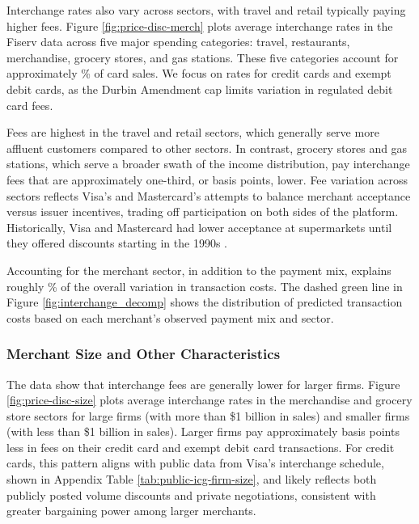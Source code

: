 \documentclass[main.tex]{subfiles}
\begin{document}
Interchange rates also vary across sectors, with travel and retail typically paying higher fees.
Figure \ref{fig:price-disc-merch} plots average interchange rates in the Fiserv data across five major spending categories: travel, restaurants, merchandise, grocery stores, and gas stations.
These five categories account for approximately \% of card sales.
We focus on rates for credit cards and exempt debit cards, as the Durbin Amendment cap limits variation in regulated debit card fees.

Fees are highest in the travel and retail sectors, which generally serve more affluent customers compared to other sectors.
In contrast, grocery stores and gas stations, which serve a broader swath of the income distribution, pay interchange fees that are approximately one-third, or  basis points, lower.
Fee variation across sectors reflects Visa's and Mastercard's attempts to balance merchant acceptance versus issuer incentives, trading off participation on both sides of the platform.
Historically, Visa and Mastercard had lower acceptance at supermarkets until they offered discounts starting in the 1990s \citep{Stearns2011}.

Accounting for the merchant sector, in addition to the payment mix, explains roughly \% of the overall variation in transaction costs.
The dashed green line in Figure \ref{fig:interchange_decomp} shows the distribution of predicted transaction costs based on each merchant's observed payment mix and sector. 

\subsubsection{Merchant Size and Other Characteristics}

The data show that interchange fees are generally lower for larger firms.
Figure \ref{fig:price-disc-size} plots average interchange rates in the merchandise and grocery store sectors for large firms (with more than \$1 billion in sales) and smaller firms (with less than \$1 billion in sales).
Larger firms pay approximately  basis points less in fees on their credit card and exempt debit card transactions.
For credit cards, this pattern aligns with public data from Visa's interchange schedule, shown in Appendix Table \ref{tab:public-icg-firm-size}, and likely reflects both publicly posted volume discounts and private negotiations, consistent with greater bargaining power among larger merchants.
\end{document}
